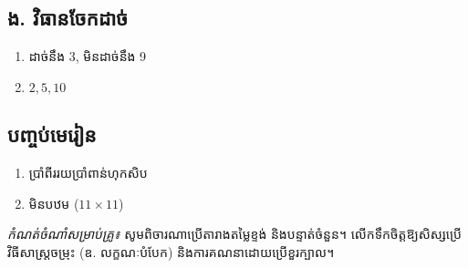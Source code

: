\begin{multicols}{2}
\subsection*{ង. វិធានចែកដាច់}
\begin{enumerate}[label=\arabic*.]
    \item ដាច់នឹង 3, មិនដាច់នឹង 9
    \item $2, 5, 10$
\end{enumerate}

\subsection*{បញ្ចប់មេរៀន}
\begin{enumerate}[label=\arabic*.]
    \item ប្រាំពីររយប្រាំពាន់ហុកសិប
    \item មិនបឋម ($11\times11$)
\end{enumerate}
\end{multicols}

\vfill
\noindent\textit{កំណត់ចំណាំសម្រាប់គ្រូ៖} សូមពិចារណាប្រើតារាងតម្លៃខ្ទង់ និងបន្ទាត់ចំនួន។ លើកទឹកចិត្តឱ្យសិស្សប្រើវិធីសាស្ត្រចម្រុះ (ឧ. លក្ខណៈបំបែក) និងការគណនាដោយប្រើខួរក្បាល។


